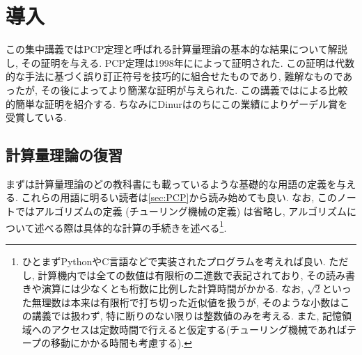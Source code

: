\chapter{導入}

この集中講義ではPCP定理と呼ばれる計算量理論の基本的な結果について解説し, その証明を与える.
PCP定理は1998年に\citet{AroraS98,AroraLMSS98}によって証明された.
この証明は代数的な手法に基づく誤り訂正符号を技巧的に組合せたものであり, 難解なものであったが, その後\citet{Din07}によってより簡潔な証明が与えられた.
この講義では\citet{Din07}による比較的簡単な証明を紹介する.
ちなみにDinurはのちにこの業績によりゲーデル賞を受賞している.

\section{計算量理論の復習}
まずは計算量理論のどの教科書にも載っているような基礎的な用語の定義を与える. これらの用語に明るい読者は\cref{sec:PCP}から読み始めても良い.
なお, このノートではアルゴリズムの定義 (チューリング機械の定義) は省略し, アルゴリズムについて述べる際は具体的な計算の手続きを述べる\footnote{ひとまずPythonやC言語などで実装されたプログラムを考えれば良い. ただし, 計算機内では全ての数値は有限桁の二進数で表記されており, その読み書きや演算には少なくとも桁数に比例した計算時間がかかる. なお, $\sqrt{2}$といった無理数は本来は有限桁で打ち切った近似値を扱うが, そのような小数はこの講義では扱わず, 特に断りのない限りは整数値のみを考える. また, 記憶領域へのアクセスは定数時間で行えると仮定する(チューリング機械であればテープの移動にかかる時間も考慮する).}.

